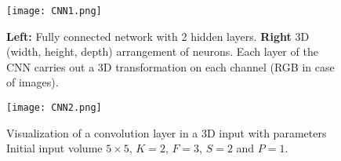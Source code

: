 \begin{figure}[tb] 
\centering 
\texttt{[image: CNN1.png]} 
\caption[Fully connected network VS CNN]{\textbf{Left:} Fully connected network with 2 hidden layers. \textbf{Right} 3D (width, height, depth) arrangement of neurons. Each layer of the CNN carries out a 3D transformation on each channel (RGB in case of images). }
\label{fig:CNNim1} 
\end{figure}
\begin{figure}[tb] 
\centering 
\texttt{[image: CNN2.png]} 
\caption[Convolution layer]{Visualization of a convolution layer in a 3D input with parameters Initial input volume $5 \times 5$, $K=2$, $F=3$, $S=2$ and $P=1$.}
\label{fig:CNNim2} 
\end{figure}

